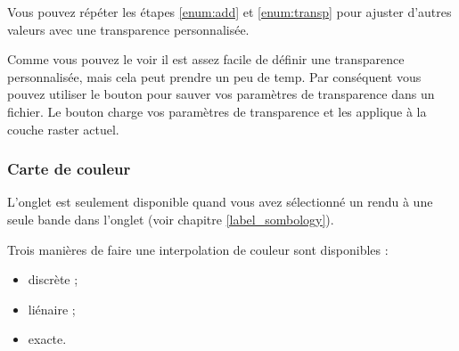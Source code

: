 Vous pouvez répéter les étapes \ref{enum:add} et \ref{enum:transp} pour ajuster
d'autres valeurs avec une transparence personnalisée. 

Comme vous pouvez le voir il est assez facile de définir une transparence
personnalisée, mais cela peut prendre un peu de temp. Par conséquent vous
pouvez utiliser le bouton  pour sauver vos paramètres  de transparence dans un fichier. Le
bouton  
charge vos paramètres de transparence et les applique à la couche raster actuel.

 \subsubsection{Carte de couleur} \label{label_colormaptab}

L'onglet  est seulement disponible quand vous avez sélectionné un
rendu à une seule bande dans l'onglet   (voir chapitre
\ref{label_sombology}).

Trois manières de faire une interpolation de couleur sont disponibles :
\begin{itemize}
\item discrète ;
\item liénaire ;
\item exacte.
\end{itemize}

